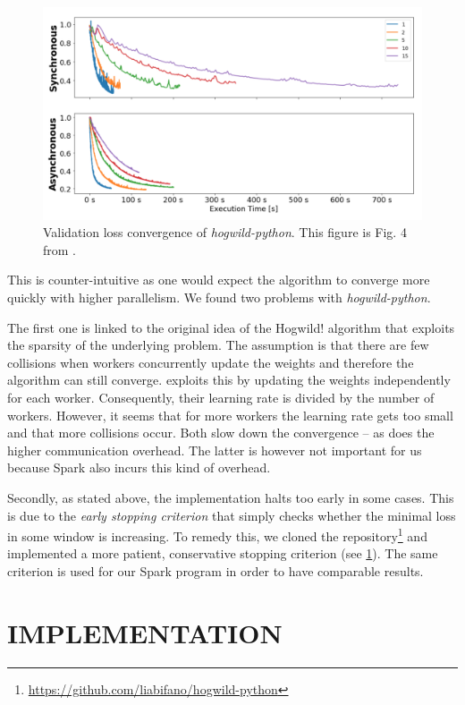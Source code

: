 \documentclass[a4paper, 11pt, conference]{ieeeconf}
\begin{document}
\begin{figure}[ht]
  \centering
  \includegraphics[scale=0.25]{their-figure-hogwild-python}
  \caption{Validation loss convergence of \textit{hogwild-python}. This figure is Fig. 4 from \cite{hogwild-python}.}
  \label{their-figure}
\end{figure}

This is counter-intuitive as one would expect the algorithm to converge more quickly with higher parallelism. 
We found two problems with \textit{hogwild-python}.

The first one is linked to the original idea of the Hogwild! algorithm \cite{hogwild-paper} that exploits the sparsity of the underlying problem. The assumption is that there are few collisions when workers concurrently update the weights and therefore the algorithm can still converge. \cite{hogwild-python} exploits this by updating the weights independently for each worker. Consequently, their learning rate is divided by the number of workers.
However, it seems that for more workers the learning rate gets too small and that more collisions occur. Both slow down the convergence -- as does the higher communication overhead. The latter is however not important for us because Spark also incurs this kind of overhead.

Secondly, as stated above, the implementation halts too early in some cases. This is due to the \textit{early stopping criterion} that simply checks whether the minimal loss in some window is increasing. To remedy this, we cloned the repository\footnote{\url{https://github.com/liabifano/hogwild-python}} and implemented a more patient, conservative stopping criterion (see \ref{implementation}). The same criterion is used for our Spark program in order to have comparable results.

\section{IMPLEMENTATION}
\label{implementation}
\end{document}

